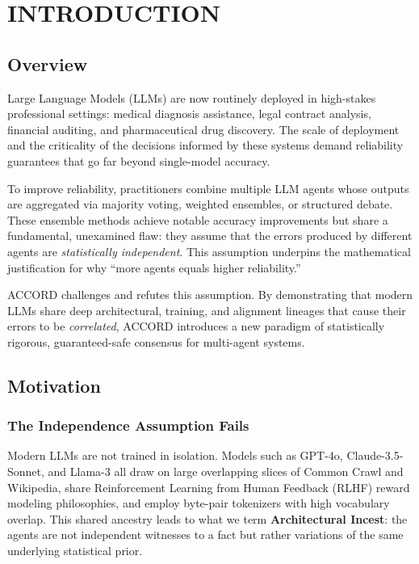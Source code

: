 \documentclass[12pt,a4paper]{report}
\begin{document}
\listoffigures
{}

\listoftables
{}

\chapter{INTRODUCTION}

\section{Overview}

Large Language Models (LLMs) are now routinely deployed in high-stakes professional settings: medical diagnosis assistance, legal contract analysis, financial auditing, and pharmaceutical drug discovery. The scale of deployment and the criticality of the decisions informed by these systems demand reliability guarantees that go far beyond single-model accuracy.

To improve reliability, practitioners combine multiple LLM agents whose outputs are aggregated via majority voting, weighted ensembles, or structured debate. These ensemble methods achieve notable accuracy improvements but share a fundamental, unexamined flaw: they assume that the errors produced by different agents are \emph{statistically independent}. This assumption underpins the mathematical justification for why ``more agents equals higher reliability.''

ACCORD challenges and refutes this assumption. By demonstrating that modern LLMs share deep architectural, training, and alignment lineages that cause their errors to be \emph{correlated}, ACCORD introduces a new paradigm of statistically rigorous, guaranteed-safe consensus for multi-agent systems.

\section{Motivation}

\subsection{The Independence Assumption Fails}
Modern LLMs are not trained in isolation. Models such as GPT-4o, Claude-3.5-Sonnet, and Llama-3 all draw on large overlapping slices of Common Crawl and Wikipedia, share Reinforcement Learning from Human Feedback (RLHF) reward modeling philosophies, and employ byte-pair tokenizers with high vocabulary overlap. This shared ancestry leads to what we term \textbf{Architectural Incest}: the agents are not independent witnesses to a fact but rather variations of the same underlying statistical prior.
\end{document}
